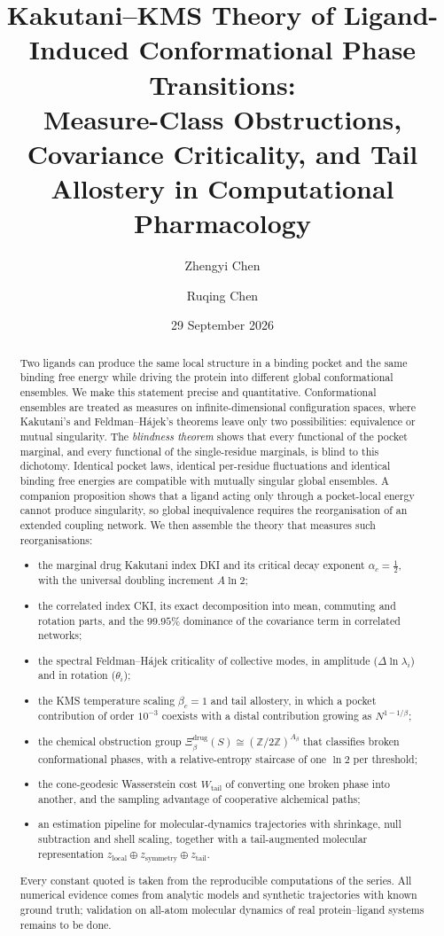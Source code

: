\documentclass[11pt,reqno]{amsart}
\title[Kakutani--KMS theory of ligand-induced conformational phase transitions]{Kakutani--KMS Theory of Ligand-Induced Conformational Phase Transitions:\\ Measure-Class Obstructions, Covariance Criticality, and Tail Allostery in Computational Pharmacology}
\author[Z. Chen]{Zhengyi Chen}
\author[R. Chen]{Ruqing Chen}
\date{29 September 2026}
\theoremstyle{plain}
\theoremstyle{definition}
\theoremstyle{remark}
\numberwithin{equation}{section}
\newcommand{\Z}{\mathbb{Z}}
\newcommand{\Xib}{\Xi_\beta^{\mathrm{drug}}(S)}
\newcommand{\Wtail}{W_{\mathrm{tail}}}
\begin{document}
\begin{abstract}
Two ligands can produce the same local structure in a binding pocket and the same binding free energy while driving the protein into different global conformational ensembles. We make this statement precise and quantitative. Conformational ensembles are treated as measures on infinite-dimensional configuration spaces, where Kakutani's and Feldman--H\'ajek's theorems leave only two possibilities: equivalence or mutual singularity. The \emph{blindness theorem} shows that every functional of the pocket marginal, and every functional of the single-residue marginals, is blind to this dichotomy. Identical pocket laws, identical per-residue fluctuations and identical binding free energies are compatible with mutually singular global ensembles. A companion proposition shows that a ligand acting only through a pocket-local energy cannot produce singularity, so global inequivalence requires the reorganisation of an extended coupling network. We then assemble the theory that measures such reorganisations:
\begin{itemize}[leftmargin=*]
\item the marginal drug Kakutani index DKI and its critical decay exponent $\alpha_c=\tfrac12$, with the universal doubling increment $A\ln2$;
\item the correlated index CKI, its exact decomposition into mean, commuting and rotation parts, and the $99.95\%$ dominance of the covariance term in correlated networks;
\item the spectral Feldman--H\'ajek criticality of collective modes, in amplitude ($\Delta\ln\lambda_i$) and in rotation ($\theta_i$);
\item the KMS temperature scaling $\beta_c=1$ and tail allostery, in which a pocket contribution of order $10^{-3}$ coexists with a distal contribution growing as $N^{1-1/\beta}$;
\item the chemical obstruction group $\Xib\cong(\Z/2\Z)^{A_\beta}$ that classifies broken conformational phases, with a relative-entropy staircase of one $\ln2$ per threshold;
\item the cone-geodesic Wasserstein cost $\Wtail$ of converting one broken phase into another, and the sampling advantage of cooperative alchemical paths;
\item an estimation pipeline for molecular-dynamics trajectories with shrinkage, null subtraction and shell scaling, together with a tail-augmented molecular representation $z_{\mathrm{local}}\oplus z_{\mathrm{symmetry}}\oplus z_{\mathrm{tail}}$.
\end{itemize}
Every constant quoted is taken from the reproducible computations of the series. All numerical evidence comes from analytic models and synthetic trajectories with known ground truth; validation on all-atom molecular dynamics of real protein--ligand systems remains to be done.
\end{abstract}
\end{document}

